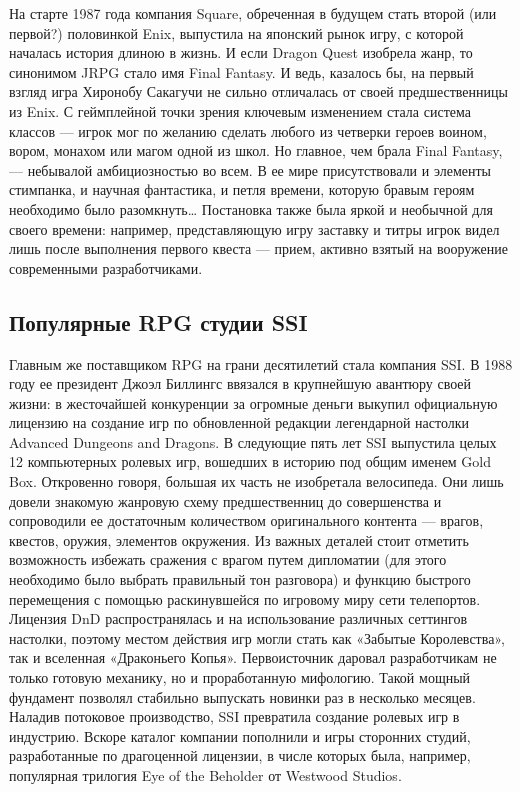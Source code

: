 На старте 1987 года компания Square, обреченная в будущем стать второй (или первой?) половинкой Enix, выпустила на японский рынок игру, с которой началась история длиною в жизнь. И если Dragon Quest изобрела жанр, то синонимом JRPG стало имя Final Fantasy.
И ведь, казалось бы, на первый взгляд игра Хиронобу Сакагучи не сильно отличалась от своей предшественницы из Enix. С геймплейной точки зрения ключевым изменением стала система классов — игрок мог по желанию сделать любого из четверки героев воином, вором, монахом или магом одной из школ. Но главное, чем брала Final Fantasy, — небывалой амбициозностью во всем. В ее мире присутствовали и элементы стимпанка, и научная фантастика, и петля времени, которую бравым героям необходимо было разомкнуть… Постановка также была яркой и необычной для своего времени: например, представляющую игру заставку и титры игрок видел лишь после выполнения первого квеста — прием, активно взятый на вооружение современными разработчиками.

\subsection{Популярные RPG студии SSI}
Главным же поставщиком RPG на грани десятилетий стала компания SSI. В 1988 году ее президент Джоэл Биллингс ввязался в крупнейшую авантюру своей жизни: в жесточайшей конкуренции за огромные деньги выкупил официальную лицензию на создание игр по обновленной редакции легендарной настолки Advanced Dungeons and Dragons. В следующие пять лет SSI выпустила целых 12 компьютерных ролевых игр, вошедших в историю под общим именем Gold Box. Откровенно говоря, большая их часть не изобретала велосипеда. Они лишь довели знакомую жанровую схему предшественниц до совершенства и сопроводили ее достаточным количеством оригинального контента — врагов, квестов, оружия, элементов окружения. Из важных деталей стоит отметить возможность избежать сражения с врагом путем дипломатии (для этого необходимо было выбрать правильный тон разговора) и функцию быстрого перемещения с помощью раскинувшейся по игровому миру сети телепортов. 
Лицензия DnD распространялась и на использование различных сеттингов настолки, поэтому местом действия игр могли стать как «Забытые Королевства», так и вселенная «Драконьего Копья». Первоисточник даровал разработчикам не только готовую механику, но и проработанную мифологию. Такой мощный фундамент позволял стабильно выпускать новинки раз в несколько месяцев. Наладив потоковое производство, SSI превратила создание ролевых игр в индустрию. Вскоре каталог компании пополнили и игры сторонних студий, разработанные по драгоценной лицензии, в числе которых была, например, популярная трилогия Eye of the Beholder от Westwood Studios.

